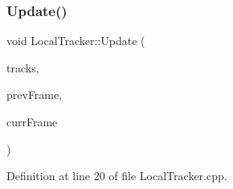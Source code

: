 \subsubsection{\texorpdfstring{Update()}{Update()}}
{\footnotesize\ttfamily void Local\+Tracker\+::\+Update (\begin{DoxyParamCaption}\item[{\mbox{\hyperlink{track_8h_aaa9881295be74ce8bd6990b9aafaf788}{tracks\+\_\+t}} \&}]{tracks,  }\item[{cv\+::\+U\+Mat}]{prev\+Frame,  }\item[{cv\+::\+U\+Mat}]{curr\+Frame }\end{DoxyParamCaption})}



Definition at line 20 of file Local\+Tracker.\+cpp.


